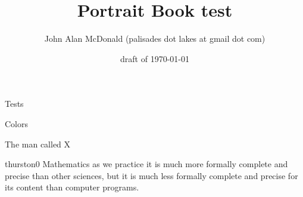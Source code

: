 \documentclass{PalisadesLakesBook}
\title{Portrait Book test}
\author{John Alan McDonald 
(palisades dot lakes at gmail dot com)}
\date{draft of \today}
\begin{document}
\maketitle
\PalisadesLakesTableOfContents

\begin{plSection}{Tests}

\begin{plSection}{Colors}

\begin{plDiagram}{}{}{}
\end{plDiagram}
\begin{plTable}{}{}{}
\end{plTable}
\begin{plQuote}{}{}{}
\end{plQuote}
\begin{plAlgorithm}{}{}{}
\end{plAlgorithm}
\begin{plListing}{}{}{}
\end{plListing}

\begin{plNote}{}{}{}
\end{plNote}
\begin{plExercise}{}{}{}
\end{plExercise}

\begin{plDefinition}{}{}{}
\end{plDefinition}
\begin{plExample}{}{}{}
\end{plExample}
\begin{plAxiom}{}{}{}
\end{plAxiom}
\begin{plAxiomSchema}{}{}{}
\end{plAxiomSchema}
\begin{plLemma}{}{}{}
\end{plLemma}
\begin{plTheorem}{}{}{}
\end{plTheorem}
\begin{plCorollary}{}{}{}
\end{plCorollary}

\end{plSection}%

\begin{plSection}{The man called X}
\begin{plQuote}
{}%
{thurston0}%
{Mathematics as we practice it is much more formally
complete and precise than
other sciences, but it is much less formally complete and precise
for its content than computer programs.
}
\end{plQuote}


\end{plSection}
\end{plSection}
\end{document}
